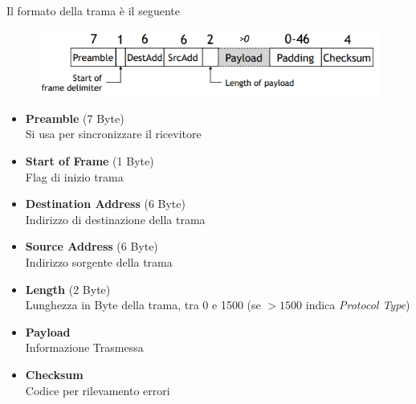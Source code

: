 \documentclass{article}
\begin{document}
                Il formato della trama è il seguente
                \begin{figure}[H]
                    \centering
                    \includegraphics[width=\textwidth]{pic/trama_802.png}
                    \label{Trama 802.3}
                \end{figure}
                \begin{itemize}
                    \item \textbf{Preamble} (7 Byte) \\
                          Si usa per sincronizzare il ricevitore
                    \item \textbf{Start of Frame} (1 Byte) \\
                          Flag di inizio trama
                    \item \textbf{Destination Address} (6 Byte) \\
                          Indirizzo di destinazione della trama
                    \item \textbf{Source Address} (6 Byte) \\
                          Indirizzo sorgente della trama
                    \item \textbf{Length} (2 Byte) \\
                          Lunghezza in Byte della trama, tra 0 e 1500 (se $ >1500 $ indica \textit{Protocol Type})
                    \item \textbf{Payload} \\
                          Informazione Trasmessa
                    \item \textbf{Checksum} \\
                          Codice per rilevamento errori
                \end{itemize}
\end{document}
